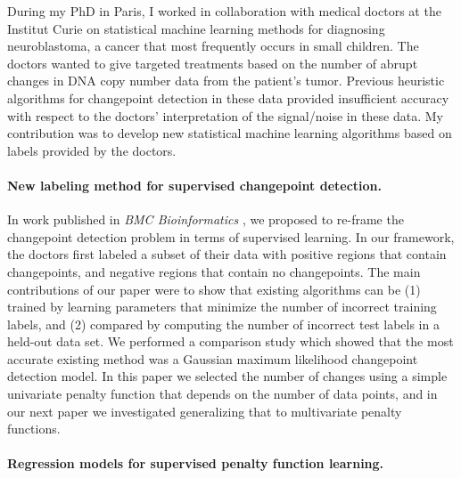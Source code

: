 \documentclass{article}
\begin{document}
During my PhD in Paris, I worked in collaboration with medical doctors
at the Institut Curie on statistical machine learning methods for
diagnosing neuroblastoma, a cancer that most frequently occurs in
small children. The doctors wanted to give targeted treatments based
on the number of abrupt changes in DNA copy number data from the
patient's tumor. Previous heuristic algorithms for changepoint
detection in these data provided insufficient accuracy with respect to
the doctors' interpretation of the signal/noise in these data. My
contribution was to develop new statistical machine learning
algorithms based on labels provided by the doctors.

\paragraph{New labeling method for supervised changepoint detection.}

In work published in \emph{BMC Bioinformatics}
\citep{HOCKING-breakpoints}, we proposed to re-frame the changepoint
detection problem in terms of supervised learning. In our framework,
the doctors first labeled a subset of their data with positive regions
that contain changepoints, and negative regions that contain no
changepoints. 
The main contributions of our
paper were to show that existing algorithms can be (1) trained by
learning parameters that minimize the number of
incorrect training labels, and (2) compared by computing the number of
incorrect test labels in a held-out data set. We performed a
comparison study which showed that the most accurate existing method
was a Gaussian maximum likelihood changepoint detection model. 
In this paper we selected the number of changes using a
simple univariate penalty function that depends on the number of data
points, and in our next paper we investigated generalizing that to
multivariate penalty functions.

\paragraph{Regression models for supervised penalty function
  learning.}
\end{document}
